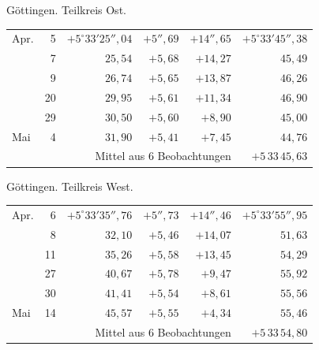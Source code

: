 \noindent\begin{minipage}[t]{.495\textwidth}\centering Göttingen. Teilkreis Ost.\par\smallskip
{\scriptsize\setlength{\tabcolsep}{1pt}\renewcommand{\arraystretch}{1.2}\begin{tabular}{lr|r|r|r|r|}
Apr.&5&$+5^\circ33'25''{,}04$&$+5''{,}69$&$+14''{,}65$&$+5^\circ33'45''{,}38$\\
&7&$25{,}54$&$+5{,}68$&$+14{,}27$&$45{,}49$\\
&9&$26{,}74$&$+5{,}65$&$+13{,}87$&$46{,}26$\\
&20&$29{,}95$&$+5{,}61$&$+11{,}34$&$46{,}90$\\
&29&$30{,}50$&$+5{,}60$&$+8{,}90$&$45{,}00$\\
Mai&4&$31{,}90$&$+5{,}41$&$+7{,}45$&$44{,}76$\\
\cline{6-6}\multicolumn{5}{r}{Mittel aus 6 Beobachtungen}&$+5\,33\,45{,}63$
\end{tabular}}\end{minipage}\hfill\begin{minipage}[t]{.495\textwidth}\centering Göttingen. Teilkreis West.\par\smallskip
{\scriptsize\setlength{\tabcolsep}{1pt}\renewcommand{\arraystretch}{1.2}\begin{tabular}{lr|r|r|r|r}
Apr.&6&$+5^\circ33'35''{,}76$&$+5''{,}73$&$+14''{,}46$&$+5^\circ33'55''{,}95$\\
&8&$32{,}10$&$+5{,}46$&$+14{,}07$&$51{,}63$\\
&11&$35{,}26$&$+5{,}58$&$+13{,}45$&$54{,}29$\\
&27&$40{,}67$&$+5{,}78$&$+9{,}47$&$55{,}92$\\
&30&$41{,}41$&$+5{,}54$&$+8{,}61$&$55{,}56$\\
Mai&14&$45{,}57$&$+5{,}55$&$+4{,}34$&$55{,}46$\\
\cline{6-6}\multicolumn{5}{r}{Mittel aus 6 Beobachtungen}&$+5\,33\,54{,}80$
\end{tabular}}\end{minipage}
\par\vspace{4mm}

